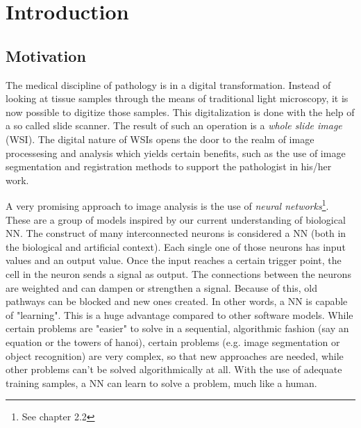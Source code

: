 \chapter{Introduction}

\section{Motivation}
The medical discipline of pathology is in a digital transformation. Instead of looking at tissue samples through the means of traditional light microscopy, it is now possible to digitize those samples. This digitalization is done with the help of a so called slide scanner. The result of such an operation is a \emph{whole slide image} (WSI)\cite{Cornish13}. The digital nature of WSIs opens the door to the realm of image processesing and analysis which yields certain benefits, such as the use of image segmentation and registration methods to support the pathologist in his/her work.

A very promising approach to image analysis is the use of \emph{neural networks}\footnote{See chapter 2.2}. These are a group of  models inspired by our current understanding of biological NN. The construct of many interconnected neurons is considered a NN (both in the biological and artificial context). Each single one of those neurons has input values and an output value. Once the input reaches a certain trigger point, the cell in the neuron sends a signal as output. The connections between the neurons are weighted and can dampen or strengthen a signal. Because of this, old pathways can be blocked and new ones created. In other words, a NN is capable of "learning"\cite{Kriesel07}. This is a huge advantage compared to other software models. While certain problems are "easier" to solve in a sequential, algorithmic fashion (say an equation or the towers of hanoi), certain problems (e.g. image segmentation or object recognition) are very complex, so that new approaches are needed, while other problems can't be solved algorithmically at all. With the use of adequate training samples, a NN can learn to solve a problem, much like a human.

